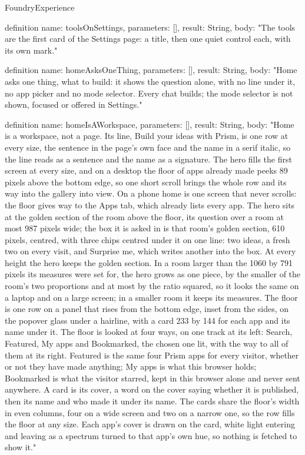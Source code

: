 \begin{lexlean}{FoundryExperience}
\begin{semanticmodule}
definition{
  name: toolsOnSettings,
  parameters: [],
  result: String,
  body: "The tools are the first card of the Settings page: a title, then one quiet control each, with its own mark."
}

definition{
  name: homeAsksOneThing,
  parameters: [],
  result: String,
  body: "Home asks one thing, what to build: it shows the question alone, with no line under it, no app picker and no mode selector. Every chat builds; the mode selector is not shown, focused or offered in Settings."
}

definition{
  name: homeIsAWorkspace,
  parameters: [],
  result: String,
  body: "Home is a workspace, not a page. Its line, Build your ideas with Prism, is one row at every size, the sentence in the page's own face and the name in a serif italic, so the line reads as a sentence and the name as a signature. The hero fills the first screen at every size, and on a desktop the floor of apps already made peeks 89 pixels above the bottom edge, so one short scroll brings the whole row and its way into the gallery into view. On a phone home is one screen that never scrolls: the floor gives way to the Apps tab, which already lists every app. The hero sits at the golden section of the room above the floor, its question over a room at most 987 pixels wide; the box it is asked in is that room's golden section, 610 pixels, centred, with three chips centred under it on one line: two ideas, a fresh two on every visit, and Surprise me, which writes another into the box. At every height the hero keeps the golden section. In a room larger than the 1060 by 791 pixels its measures were set for, the hero grows as one piece, by the smaller of the room's two proportions and at most by the ratio squared, so it looks the same on a laptop and on a large screen; in a smaller room it keeps its measures. The floor is one row on a panel that rises from the bottom edge, inset from the sides, on the popover glass under a hairline, with a card 233 by 144 for each app and its name under it. The floor is looked at four ways, on one track at its left: Search, Featured, My apps and Bookmarked, the chosen one lit, with the way to all of them at its right. Featured is the same four Prism apps for every visitor, whether or not they have made anything; My apps is what this browser holds; Bookmarked is what the visitor starred, kept in this browser alone and never sent anywhere. A card is its cover, a word on the cover saying whether it is published, then its name and who made it under its name. The cards share the floor's width in even columns, four on a wide screen and two on a narrow one, so the row fills the floor at any size. Each app's cover is drawn on the card, white light entering and leaving as a spectrum turned to that app's own hue, so nothing is fetched to show it."
}


\end{semanticmodule}
\end{lexlean}
